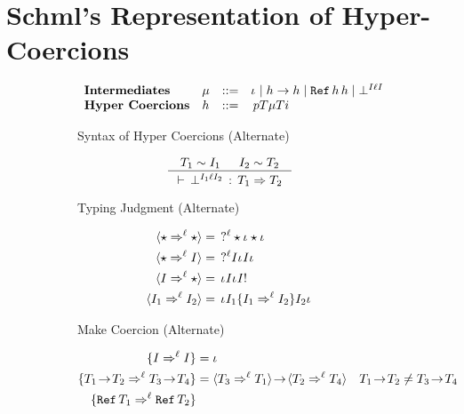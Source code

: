 \documentclass[acmtog, authorversion, acmlarge]{acmart}
\begin{document}
\clearpage

\section{Schml's Representation of Hyper-Coercions}
\begin{figure}[tbh]
  \centering
  \begin{subfigure}{.5\textwidth}
    \[
    \begin{array}{llcl}
      \textbf{Intermediates}&
      \Med  & ::= & \id \mid \fn{\HC}{\HC} \mid \rf{\HC}{\HC} %
                  \mid \failed{\I}{\Lbl}{\I}\\
      \textbf{Hyper Coercions}&
      \HC   & ::= & \hc{\Prj}{\T}{\Med}{\T}{\Inj}
    \end{array}
    \]
    \caption{Syntax of Hyper Coercions (Alternate)}
    \label{fig:CompilerhcSyntax}
  \end{subfigure}%
  \begin{subfigure}{.5\textwidth}
    \begin{gather*}
      \inference{\T_1 \sim \I_1 & \I_2 \sim \T_2}
                {\cwt{\failed{\I_1}{\Lbl}{\I_2}}{\T_1}{\T_2}}
    \end{gather*}
    \caption{Typing Judgment (Alternate)}
    \label{fig:CompilerTyping}
  \end{subfigure}
  \begin{subfigure}{.35\textwidth}
    \begin{align*}
      \langle \star \Rightarrow^{\ell} \star \rangle &= \; \,  ?^{\ell} \star \iota_{} \star \iota_{} \,\\
      \langle \star \Rightarrow^{\ell} I \rangle   &= \; \,  ?^{\ell} I \iota_{} I \iota_{} \, \\
      \langle I \Rightarrow^{\ell} \star \rangle   &= \, \iota_{} I \iota_{} I  ! \, \\
      \langle I_1 \Rightarrow^{\ell} I_2 \rangle &= \, \iota_{} I_1 \{ I_1 \Rightarrow^{\ell} I_2 \} I_2 \iota_{} \,
    \end{align*}
    \caption{Make Coercion (Alternate)}
    \label{fig:makeCoercion}
  \end{subfigure}%
  \begin{subfigure}{.65\textwidth}
    \begin{align*}
      \mkIcrcn{\I}{\I}   &= \id\\
      \mkIcrcn{\Fn[\!]{\T_{1}}{\T_{2}}}{\Fn[\!]{\T_{3}}{\T_{4}}} %
      &= \fn[\!]{\mkcrcn{\T_{3}}{\T_{1}}}{\mkcrcn{\T_{2}}{\T_{4}}}
      & \Fn[\!]{\T_{1}}{\T_{2}} \neq \Fn[\!]{\T_{3}}{\T_{4}} \\
      \mkIcrcn{\Ref{\T_1}}{\Ref{\T_2}} %

\end{align*}
\end{subfigure}
\end{figure}
\end{document}
